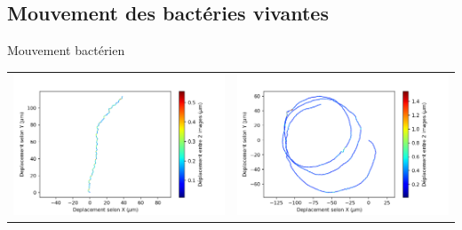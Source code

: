 \documentclass[11pt]{beamer}
\begin{document}
\subsection{Mouvement des bactéries vivantes}


\begin{frame}{Mouvement bactérien}
\begin{center}
    \begin{tabular}{cc}
    \setlength\tabcolsep{-2cm}
    \includegraphics[scale=0.3]{Trajectory_bac_1} & \includegraphics[scale=0.3]{Trajectory_bac_16} \\

\end{tabular}
\end{center}
\end{frame}
\end{document}
